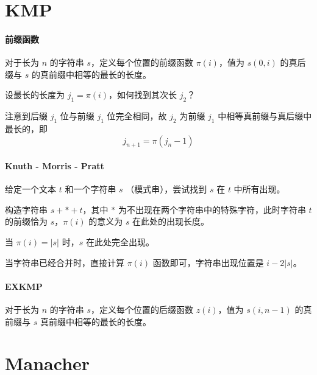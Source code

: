 \documentclass{probook}
\begin{document}
\begin{multicols}{2}
\section{KMP}

\paragraph{前缀函数}

对于长为 $n$ 的字符串 $s$，定义每个位置的前缀函数 $\pi(i)$，值为 $s(0,i)$ 的真后缀与 $s$ 的真前缀中相等的最长的长度。

设最长的长度为 $j_1=\pi(i)$，如何找到其次长 $j_2$？

注意到后缀 $j_1$ 位与前缀 $j_1$ 位完全相同，故 $j_2$ 为前缀 $j_1$ 中相等真前缀与真后缀中最长的，即
\[j_{n+1} = \pi(j_n-1)\]



\paragraph{Knuth - Morris - Pratt}

给定一个文本 $t$ 和一个字符串 $s$ （模式串），尝试找到 $s$ 在 $t$ 中所有出现。

构造字符串 $s+*+t$，其中 $*$ 为不出现在两个字符串中的特殊字符，此时字符串 $t$ 的前缀恰为 $s$，$\pi(i)$ 的意义为 $s$ 在此处的出现长度。

当 $\pi(i)=|s|$ 时，$s$ 在此处完全出现。

当字符串已经合并时，直接计算 $\pi(i)$ 函数即可，字符串出现位置是 $i-2|s|$。



\paragraph{EXKMP}

对于长为 $n$ 的字符串 $s$，定义每个位置的后缀函数 $z(i)$，值为 $s(i,n-1)$ 的真前缀与 $s$ 真前缀中相等的最长的长度。



\section{Manacher}





\end{multicols}
\end{document}
